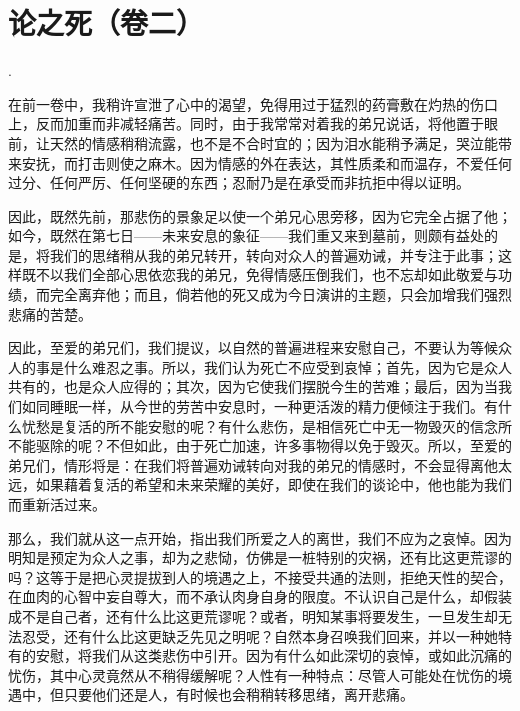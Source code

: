 
\section{论之死（卷二）}


.\par

在前一卷中，我稍许宣泄了心中的渴望，免得用过于猛烈的药膏敷在灼热的伤口上，反而加重而非减轻痛苦。同时，由于我常常对着我的弟兄说话，将他置于眼前，让天然的情感稍稍流露，也不是不合时宜的；因为泪水能稍予满足，哭泣能带来安抚，而打击则使之麻木。因为情感的外在表达，其性质柔和而温存，不爱任何过分、任何严厉、任何坚硬的东西；忍耐乃是在承受而非抗拒中得以证明。\par

因此，既然先前，那悲伤的景象足以使一个弟兄心思旁移，因为它完全占据了他；如今，既然在第七日——未来安息的象征——我们重又来到墓前，则颇有益处的是，将我们的思绪稍从我的弟兄转开，转向对众人的普遍劝诫，并专注于此事；这样既不以我们全部心思依恋我的弟兄，免得情感压倒我们，也不忘却如此敬爱与功绩，而完全离弃他；而且，倘若他的死又成为今日演讲的主题，只会加增我们强烈悲痛的苦楚。\par

因此，至爱的弟兄们，我们提议，以自然的普遍进程来安慰自己，不要认为等候众人的事是什么难忍之事。所以，我们认为死亡不应受到哀悼；首先，因为它是众人共有的，也是众人应得的；其次，因为它使我们摆脱今生的苦难；最后，因为当我们如同睡眠一样，从今世的劳苦中安息时，一种更活泼的精力便倾注于我们。有什么忧愁是复活的所不能安慰的呢？有什么悲伤，是相信死亡中无一物毁灭的信念所不能驱除的呢？不但如此，由于死亡加速，许多事物得以免于毁灭。所以，至爱的弟兄们，情形将是：在我们将普遍劝诫转向对我的弟兄的情感时，不会显得离他太远，如果藉着复活的希望和未来荣耀的美好，即使在我们的谈论中，他也能为我们而重新活过来。\par

那么，我们就从这一点开始，指出我们所爱之人的离世，我们不应为之哀悼。因为明知是预定为众人之事，却为之悲恸，仿佛是一桩特别的灾祸，还有比这更荒谬的吗？这等于是把心灵提拔到人的境遇之上，不接受共通的法则，拒绝天性的契合，在血肉的心智中妄自尊大，而不承认肉身自身的限度。不认识自己是什么，却假装成不是自己者，还有什么比这更荒谬呢？或者，明知某事将要发生，一旦发生却无法忍受，还有什么比这更缺乏先见之明呢？自然本身召唤我们回来，并以一种她特有的安慰，将我们从这类悲伤中引开。因为有什么如此深切的哀悼，或如此沉痛的忧伤，其中心灵竟然从不稍得缓解呢？人性有一种特点：尽管人可能处在忧伤的境遇中，但只要他们还是人，有时候也会稍稍转移思绪，离开悲痛。\par

